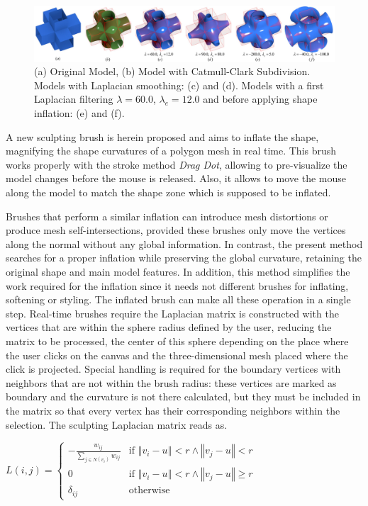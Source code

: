 \documentclass[10pt, conference]{IEEEtran}
\begin{document}
\begin{figure}[t]
\includegraphics[width=1\textwidth]{figs/cruz_lambda4}

\caption{\label{fig:Catmull_Clark}(a) Original Model, (b) Model with Catmull-Clark
Subdivision. Models with Laplacian smoothing: (c) and (d). Models
with a first Laplacian filtering $\lambda=60.0$, $\lambda_{e}=12.0$
and before applying shape inflation: (e) and (f).}
\end{figure}


A new sculpting brush is herein proposed and aims to inflate the shape,
magnifying the shape curvatures of a polygon mesh in real time. This
brush works properly with the stroke method \textsl{Drag Dot}, allowing
to pre-visualize the model changes before the mouse is released. Also,
it allows to move the mouse along the model to match the shape zone
which is supposed to be inflated.

Brushes that perform a similar inflation can introduce mesh distortions
or produce mesh self-intersections, provided these brushes only move
the vertices along the normal without any global information. In contrast,
the present method searches for a proper inflation while preserving
the global curvature, retaining the original shape and main model
features. In addition, this method simplifies the work required for
the inflation since it needs not different brushes for inflating,
softening or styling. The inflated brush can make all these operation
in a single step. Real-time brushes require the Laplacian matrix is
constructed with the vertices that are within the sphere radius defined
by the user, reducing the matrix to be processed, the center of this
sphere depending on the place where the user clicks on the canvas
and the three-dimensional mesh placed where the click is projected.
Special handling is required for the boundary vertices with neighbors
that are not within the brush radius: these vertices are marked as
boundary and the curvature is not there calculated, but they must
be included in the matrix so that every vertex has their corresponding
neighbors within the selection. The sculpting Laplacian matrix reads
as.

\begin{center}
$L\left(i,j\right)=\begin{cases}
-\frac{w_{ij}}{\underset{j\in N\left(v_{i}\right)}{\sum}w_{ij}} & \mbox{if }\left\Vert v_{i}-u\right\Vert <r\wedge\left\Vert v_{j}-u\right\Vert <r\\
0 & \mbox{if }\left\Vert v_{i}-u\right\Vert <r\wedge\left\Vert v_{j}-u\right\Vert \geq r\\
\delta_{ij} & \mbox{otherwise}
\end{cases}$
\par\end{center}
\end{document}
